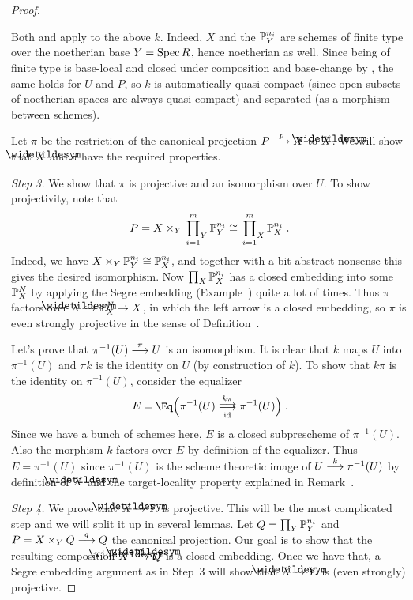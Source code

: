 \documentclass[a4paper,parskip=half,numbers=enddot, DIV=12]{scrreprt}
\begin{document}
\begin{proof}
\begin{rem}
\begin{alphanumerate}
			\item Both  and  apply to the above $k$. Indeed, $X$ and the $\mathbb{P}_Y^{n_i}$ are schemes of finite type over the noetherian base $Y=\operatorname{Spec} R$, hence noetherian as well. Since being of finite type is base-local and closed under composition and base-change by \cite[Fact~2.2.2]{alggeo1}, the same holds for $U$ and $P$, so $k$ is automatically quasi-compact (since open subsets of noetherian spaces are always quasi-compact) and separated (as a morphism between schemes).
		\end{alphanumerate}
	\end{rem}
	Let $\pi$ be the restriction of the canonical projection $P\morphism[p]X$ to $\snake{X}$. We will show that $\snake{X}$ and $\pi$ have the required properties.
	
	\emph{Step 3.} We show that $\pi$ is projective and an isomorphism over $U$. To show projectivity, note that
	\begin{align*}
		P=X\times_Y\sideset{}{_{Y}}\prod_{i=1}^m\mathbb{P}_Y^{n_i}\cong\sideset{}{_{X}}\prod_{i=1}^m\mathbb{P}_X^{n_i}\;.
	\end{align*}
	Indeed, we have $X\times_Y\mathbb{P}_Y^{n_i}\cong \mathbb{P}_X^{n_i}$, and together with a bit abstract nonsense this gives the desired isomorphism. Now $\prod_{X}\mathbb{P}_X^{n_i}$ has a closed embedding into some $\mathbb{P}_X^{N}$ by applying the Segre embedding (Example~) quite a lot of times. Thus $\pi$ factors over $\snake{X}\monomorphism\IP_X^N\morphism X$, in which the left arrow is a closed embedding, so $\pi$ is even strongly projective in the sense of Definition~.
	
	Let's prove that $\pi^{-1}(U)\morphism[\pi]U$ is an isomorphism. It is clear that $k$ maps $U$ into $\pi^{-1}(U)$ and $\pi k$ is the identity on $U$ (by construction of $k$). To show that $k\pi$ is the identity on $\pi^{-1}(U)$, consider the equalizer 
	\begin{align*}
		E=\Eq\Big(\pi^{-1}(U)\doublemorphism[k\pi][\id]\pi^{-1}(U)\Big)\;.
	\end{align*}
	Since we have a bunch of schemes here, $E$ is a closed subprescheme of $\pi^{-1}(U)$. Also the morphism $k$ factors over $E$ by definition of the equalizer. Thus $E=\pi^{-1}(U)$ since $\pi^{-1}(U)$ is the scheme theoretic image of $U\morphism[k]\pi^{-1}(U)$ by definition of $\snake{X}$ and the target-locality property explained in Remark~.
	
	\emph{Step 4.} We prove that $\snake{X}\morphism Y$ is projective. This will be the most complicated step and we will split it up in several lemmas. Let $Q=\prod_{Y}\mathbb{P}_Y^{n_i}$ and $P=X\times_YQ\morphism[q]Q$ the canonical projection. Our goal is to show that the resulting composition $\snake{X}\morphism[\snake{q}] Q$ is a closed embedding. Once we have that, a Segre embedding argument as in Step~3 will show that $\snake{X}\morphism Y$ is (even strongly) projective.
	

\end{proof}
\end{document}
